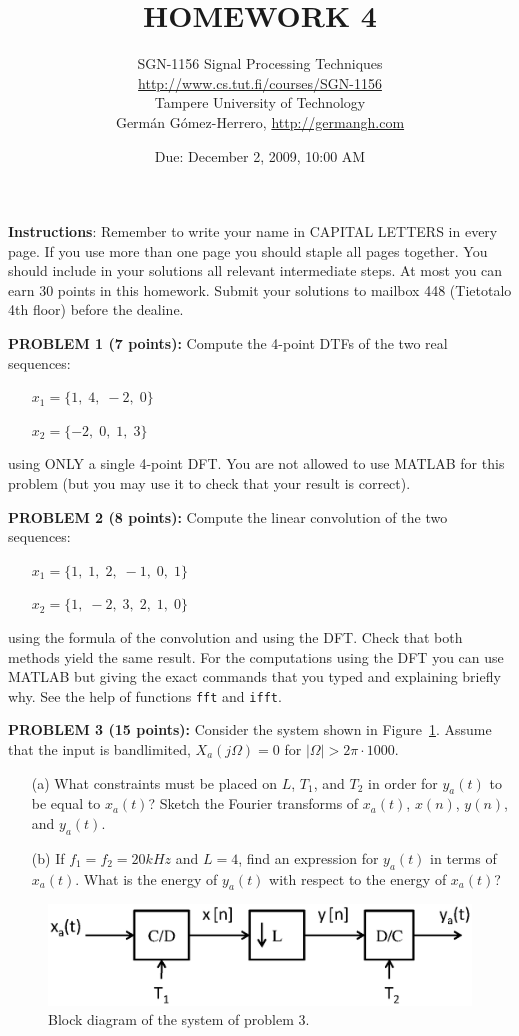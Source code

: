 \documentclass[a4paper,11pt,oneside]{article}
\title{\large{\textbf{HOMEWORK 4}}}
\author{SGN-1156 Signal Processing Techniques\\
\url{http://www.cs.tut.fi/courses/SGN-1156}\\
Tampere University of Technology\\
Germ\'an G\'omez-Herrero, \url{http://germangh.com}}
\date{Due: December 2, 2009, 10:00 AM}
\begin{document}
\maketitle

\noindent \textbf{Instructions}: Remember to write your name in CAPITAL LETTERS in every page. If you use more than one page you should staple all pages together. You should include in your solutions all relevant intermediate steps. At most you can earn 30 points in this homework. Submit your solutions to mailbox 448 (Tietotalo 4th floor) before the dealine.
\vspace{1cm} 

 

\noindent \textbf{PROBLEM 1 (7 points):} Compute the 4-point DTFs of the two real sequences:

\begin{itemize}
\item[] $x_{1}=\{1,\;4,\; -2,\; 0\}$
\item[] $x_{2}=\{-2,\; 0,\; 1,\; 3\}$
\end{itemize}

\noindent using ONLY a single 4-point DFT. You are not allowed to use MATLAB for this problem (but you may use it to check that your result is correct).

\vspace{1cm} 

\noindent \textbf{PROBLEM 2 (8 points):} Compute the linear convolution of the two sequences:

\begin{itemize}
\item[] $x_{1}=\{1,\; 1,\; 2,\; -1,\; 0,\; 1\}$
\item[] $x_{2}=\{1,\;-2,\; 3,\; 2,\; 1,\; 0\}$
\end{itemize}

\noindent using the formula of the convolution and using the DFT. Check that both methods yield the same result. For the computations using the DFT you can use MATLAB but giving the exact commands that you typed and explaining briefly why. See the help of functions \verb|fft| and \verb|ifft|.

\vspace{1cm}

\noindent \textbf{PROBLEM 3 (15 points):} Consider the system shown in Figure~\ref{fig1}. Assume that the input is bandlimited, $X_a(j\Omega)=0$ for $|\Omega|>2\pi\cdot 1000$.

\begin{itemize}
\item[(a)] What constraints must be placed on $L$, $T_1$, and $T_{2}$ in order for $y_a(t)$ to be equal to $x_a(t)$? Sketch the Fourier transforms of $x_a(t)$, $x(n)$, $y(n)$, and $y_a(t)$.
\item[(b)] If $f_1=f_2=20kHz$ and $L=4$, find an expression for $y_a(t)$ in terms of $x_a(t)$. What is the energy of $y_{a}(t)$ with respect to the energy of $x_{a}(t)$?
\end{itemize}

\begin{figure}[h!]
\centering
\includegraphics[width=.8\textwidth]{fig1.eps}
\caption{Block diagram of the system of problem 3.}
\label{fig1}
\end{figure} 
\end{document}
